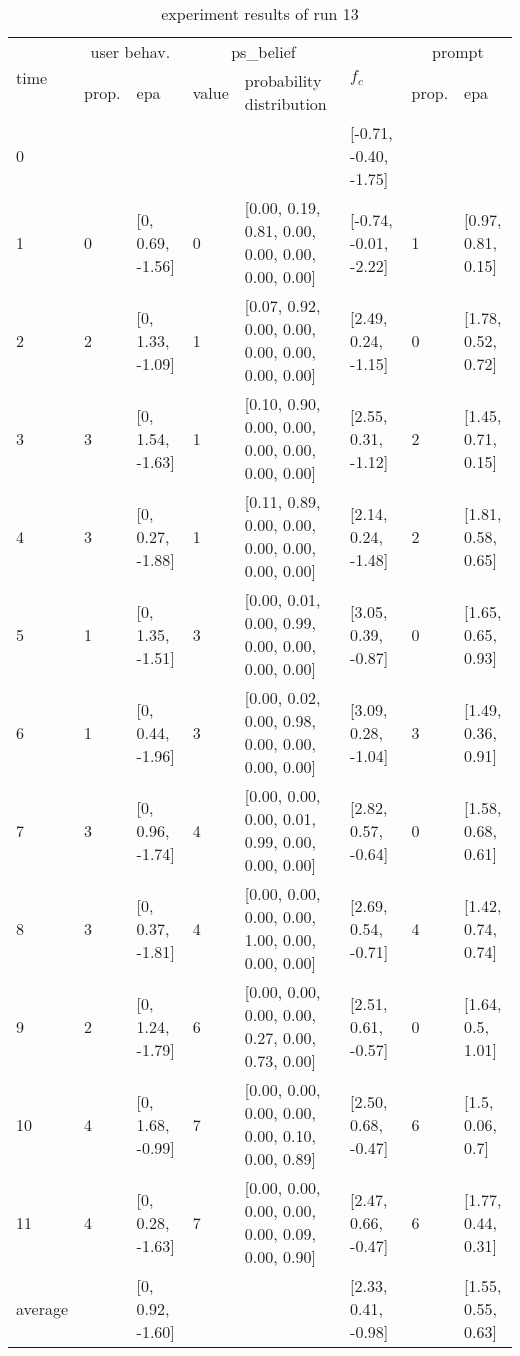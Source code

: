 \begin{table}[htbp]\footnotesize
\caption{experiment results of run 13}
\begin{tabular}{|p{0.4cm}|p{0.6cm}|l|p{0.6cm}|p{3.3cm}|l|p{0.6cm}|l|}
\hline

\multirow{2}{*}{time} & \multicolumn{2}{c|}{user behav.} & \multicolumn{2}{c|}{ps\_belief} &
\multirow{2}{*}{$f_c$} & \multicolumn{2}{c|}{prompt} \\ \cline{2-5}\cline{ 7- 8}
& prop. & epa & value & probability distribution &  & prop. & epa \\ \hline

0 & \multicolumn{1}{l|}{} &  & \multicolumn{1}{l|}{} &  & [-0.71, -0.40, -1.75] & \multicolumn{1}{l|}{} &  \\ \hline
1 & 0 & [0, 0.69, -1.56] & 0 & [0.00, 0.19, 0.81, 0.00, 0.00, 0.00, 0.00, 0.00] & [-0.74, -0.01, -2.22] & 1 & [0.97, 0.81, 0.15] \\ \hline
2 & 2 & [0, 1.33, -1.09] & 1 & [0.07, 0.92, 0.00, 0.00, 0.00, 0.00, 0.00, 0.00] & [2.49, 0.24, -1.15] & 0 & [1.78, 0.52, 0.72] \\ \hline
3 & 3 & [0, 1.54, -1.63] & 1 & [0.10, 0.90, 0.00, 0.00, 0.00, 0.00, 0.00, 0.00] & [2.55, 0.31, -1.12] & 2 & [1.45, 0.71, 0.15] \\ \hline
4 & 3 & [0, 0.27, -1.88] & 1 & [0.11, 0.89, 0.00, 0.00, 0.00, 0.00, 0.00, 0.00] & [2.14, 0.24, -1.48] & 2 & [1.81, 0.58, 0.65] \\ \hline
5 & 1 & [0, 1.35, -1.51] & 3 & [0.00, 0.01, 0.00, 0.99, 0.00, 0.00, 0.00, 0.00] & [3.05, 0.39, -0.87] & 0 & [1.65, 0.65, 0.93] \\ \hline
6 & 1 & [0, 0.44, -1.96] & 3 & [0.00, 0.02, 0.00, 0.98, 0.00, 0.00, 0.00, 0.00] & [3.09, 0.28, -1.04] & 3 & [1.49, 0.36, 0.91] \\ \hline
7 & 3 & [0, 0.96, -1.74] & 4 & [0.00, 0.00, 0.00, 0.01, 0.99, 0.00, 0.00, 0.00] & [2.82, 0.57, -0.64] & 0 & [1.58, 0.68, 0.61] \\ \hline
8 & 3 & [0, 0.37, -1.81] & 4 & [0.00, 0.00, 0.00, 0.00, 1.00, 0.00, 0.00, 0.00] & [2.69, 0.54, -0.71] & 4 & [1.42, 0.74, 0.74] \\ \hline
9 & 2 & [0, 1.24, -1.79] & 6 & [0.00, 0.00, 0.00, 0.00, 0.27, 0.00, 0.73, 0.00] & [2.51, 0.61, -0.57] & 0 & [1.64, 0.5, 1.01] \\ \hline
10 & 4 & [0, 1.68, -0.99] & 7 & [0.00, 0.00, 0.00, 0.00, 0.00, 0.10, 0.00, 0.89] & [2.50, 0.68, -0.47] & 6 & [1.5, 0.06, 0.7] \\ \hline
11 & 4 & [0, 0.28, -1.63] & 7 & [0.00, 0.00, 0.00, 0.00, 0.00, 0.09, 0.00, 0.90] & [2.47, 0.66, -0.47] & 6 & [1.77, 0.44, 0.31] \\ \hline
\multicolumn{1}{|l|}{average} & \multicolumn{1}{l|}{} & [0, 0.92, -1.60] & \multicolumn{1}{l|}{} &  & [2.33, 0.41, -0.98] & \multicolumn{1}{l|}{} & [1.55, 0.55, 0.63] \\ \hline
\end{tabular}
\label{}
\end{table}


